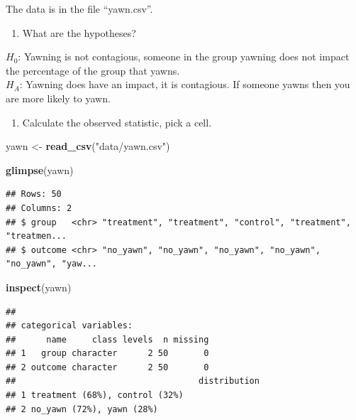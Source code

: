 \documentclass[
]{book}
\newenvironment{Shaded}{\begin{snugshade}}{\end{snugshade}}
\newcommand{\KeywordTok}[1]{\textcolor[rgb]{0.13,0.29,0.53}{\textbf{#1}}}
\newcommand{\NormalTok}[1]{#1}
\newcommand{\StringTok}[1]{\textcolor[rgb]{0.31,0.60,0.02}{#1}}
\providecommand{\tightlist}{%
  \setlength{\itemsep}{0pt}\setlength{\parskip}{0pt}}
\begin{document}
The data is in the file ``yawn.csv''.

\begin{enumerate}
\def\labelenumi{\alph{enumi}.}
\tightlist
\item
  What are the hypotheses?
\end{enumerate}

\(H_0\): Yawning is not contagious, someone in the group yawning does not impact the percentage of the group that yawns.\\
\(H_A\): Yawning does have an impact, it is contagious. If someone yawns then you are more likely to yawn.

\begin{enumerate}
\def\labelenumi{\alph{enumi}.}
\setcounter{enumi}{1}
\tightlist
\item
  Calculate the observed statistic, pick a cell.
\end{enumerate}

\begin{Shaded}
\begin{Highlighting}[]
\NormalTok{yawn <-}\StringTok{ }\KeywordTok{read_csv}\NormalTok{(}\StringTok{"data/yawn.csv"}\NormalTok{)}
\end{Highlighting}
\end{Shaded}

\begin{Shaded}
\begin{Highlighting}[]
\KeywordTok{glimpse}\NormalTok{(yawn)}
\end{Highlighting}
\end{Shaded}

\begin{verbatim}
## Rows: 50
## Columns: 2
## $ group   <chr> "treatment", "treatment", "control", "treatment", "treatmen...
## $ outcome <chr> "no_yawn", "no_yawn", "no_yawn", "no_yawn", "no_yawn", "yaw...
\end{verbatim}

\begin{Shaded}
\begin{Highlighting}[]
\KeywordTok{inspect}\NormalTok{(yawn)}
\end{Highlighting}
\end{Shaded}

\begin{verbatim}
## 
## categorical variables:  
##      name     class levels  n missing
## 1   group character      2 50       0
## 2 outcome character      2 50       0
##                                    distribution
## 1 treatment (68%), control (32%)               
## 2 no_yawn (72%), yawn (28%)
\end{verbatim}
\end{document}
